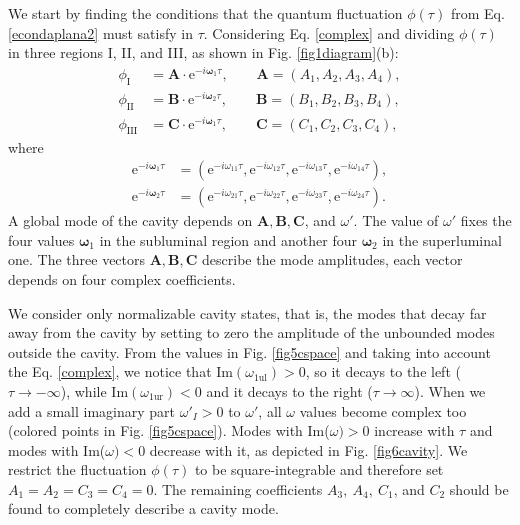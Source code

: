 \documentclass[aps,pra,reprint,amsmath,amssymb,showpacs,groupedaddress,floatfix]{revtex4-1}
\begin{document}
We start by finding the conditions that the quantum fluctuation $\phi(\tau)$ from Eq. \eqref{econdaplana2} must satisfy in $\tau$. Considering Eq.  \eqref{complex} and dividing $\phi(\tau)$ in three regions I, II, and III, as shown in Fig. \ref{fig1diagram}(b):
\begin{subequations}\begin{align}
	\phi_\text{I}		&=\textbf{A}\cdot\text{e}^{-i{\boldsymbol\omega}_1\tau},\qquad\textbf{A}=(A_1,A_2,A_3,A_4),\\
	\phi_\text{II} 	&=\textbf{B}\cdot\text{e}^{-i{\boldsymbol\omega}_2\tau},\qquad\textbf{B}=(B_1,B_2,B_3,B_4),\\
	\phi_\text{III}	&=\textbf{C}\cdot\text{e}^{-i{\boldsymbol\omega}_1\tau},\qquad\textbf{C}=(C_1,C_2,C_3,C_4),
	\end{align}\end{subequations}
where
\begin{subequations}\begin{align}
	\text{e}^{-i{\boldsymbol\omega}_1\tau}&=(\text{e}^{-i\omega_{11}\tau},\text{e}^{-i\omega_{12}\tau},
	\text{e}^{-i\omega_{13}\tau},\text{e}^{-i\omega_{14}\tau}),\\
	\text{e}^{-i{\boldsymbol\omega}_2\tau}&=(\text{e}^{-i\omega_{21}\tau},\text{e}^{-i\omega_{22}\tau},
	\text{e}^{-i\omega_{23}\tau},\text{e}^{-i\omega_{24}\tau}).
	\end{align}\end{subequations}
A global mode of the cavity depends on $\textbf{A},\textbf{B},\textbf{C}$, and $\omega'$. The value of $\omega'$ fixes the four values ${\boldsymbol\omega}_1$ in the subluminal region and another four ${\boldsymbol\omega}_2$ in the superluminal one. The three vectors $\textbf{A},\textbf{B},\textbf{C}$ describe the mode amplitudes, each vector depends on four complex coefficients.

We consider only normalizable cavity states, that is, the modes that decay far away from the cavity by setting to zero the amplitude of the unbounded modes outside the cavity. From the values in Fig. \ref{fig5cspace} and taking into account the Eq. \eqref{complex}, we notice that $\text{Im}(\omega_\text{1ul})>0$, so it decays to the left ($\tau\rightarrow -\infty$), while $\text{Im}(\omega_\text{1ur})<0$ and it decays to the right ($\tau \rightarrow \infty$). When we add a small imaginary part $\omega'_I>0$ to $\omega'$, all $\omega$ values become complex too (colored points in Fig. \ref{fig5cspace}). Modes with Im($\omega)>0$ increase with $\tau$ and modes with Im($\omega)<0$ decrease with it, as depicted in Fig. \ref{fig6cavity}. We restrict the fluctuation $\phi(\tau)$ to be square-integrable and therefore set $A_1 = A_2 = C_3 = C_4 = 0$. The remaining coefficients $A_3,\ A_4,\ C_1$, and $C_2$ should be found to completely describe a cavity mode.
\end{document}
